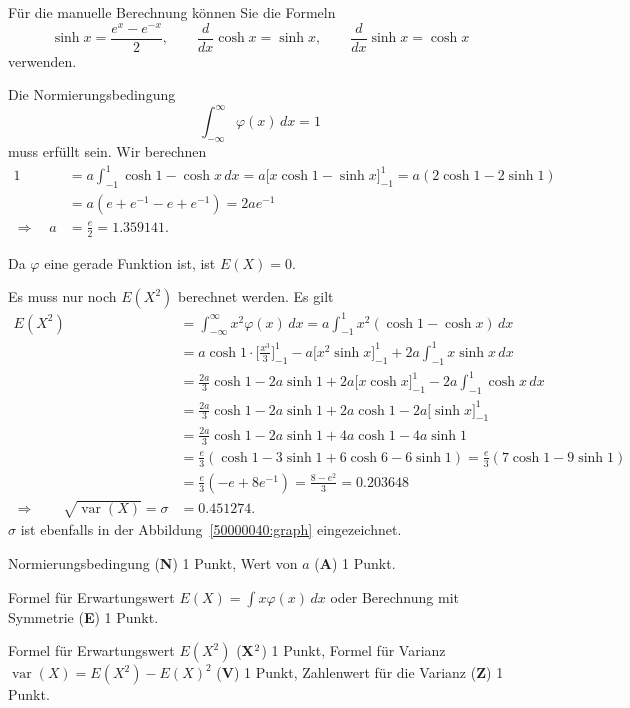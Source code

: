 \begin{hinweis}
Für die manuelle Berechnung können Sie die Formeln
\[
\sinh x = \frac{e^x - e^{-x}}2,\qquad
\frac{d}{dx}\cosh x = \sinh x, \qquad
\frac{d}{dx}\sinh x = \cosh x
\]
verwenden.
\end{hinweis}

\begin{loesung}
\begin{teilaufgaben}
\item
Die Normierungsbedingung
\[
\int_{-\infty}^\infty \varphi(x)\,dx =1
\]
muss erfüllt sein.
Wir berechnen
\begin{align*}
1
&=
a\int_{-1}^1 \cosh 1 - \cosh x\,dx
=
a\biggl[ x \cosh 1 - \sinh x\biggr]_{-1}^1
=
a(2\cosh1 -2\sinh 1)
\\
&=
a(e + e^{-1} - e + e^{-1})
=
2ae^{-1}
\\
\Rightarrow\quad
a&=\frac{e}{2}=1.359141.
\end{align*}
\item
Da $\varphi$ eine gerade Funktion ist, ist $E(X)=0$.
\item
Es muss nur noch $E(X^2)$ berechnet werden.
Es gilt
\begin{align*}
E(X^2)
&=
\int_{-\infty}^\infty x^2\varphi(x)\,dx
=
a\int_{-1}^1 x^2 (\cosh 1 - \cosh x)\,dx
\\
&=
a\cosh 1\cdot \biggl[\frac{x^3}{3}\biggr]_{-1}^1
-
a\biggl[x^2\sinh x\biggr]_{-1}^{1}
+
2a\int_{-1}^1 x\sinh x\,dx
\\
&=
\frac{2a}{3}\cosh 1 - 2a\sinh 1
+2a\biggl[x\cosh x\biggr]_{-1}^1
-2a\int_{-1}^1 \cosh x\,dx
\\
&=
\frac{2a}{3}\cosh 1
 - 2a\sinh 1
+2a\cosh 1
-2a\biggl[\sinh x\biggr]_{-1}^1
\\
&=
\frac{2a}{3}\cosh 1
 - 2a\sinh 1
+4a\cosh 1
-4a\sinh 1
\\
&=
\frac{e}{3}
(\cosh 1 -3\sinh 1 + 6\cosh 6 - 6\sinh 1)
=
\frac{e}{3}(7\cosh 1 - 9 \sinh 1)
\\
&=
\frac{e}{3}(-e+8e^{-1})
=
\frac{8-e^2}{3}
=
0.203648
\\
\Rightarrow\qquad
\sqrt{\operatorname{var}(X)}
=
\sigma
&=
0.451274.
\end{align*}
$\sigma$ ist ebenfalls in der Abbildung~\ref{50000040:graph} eingezeichnet.
\qedhere
\end{teilaufgaben}
\end{loesung}

\begin{bewertung}
\begin{teilaufgaben}
\item
Normierungsbedingung ({\bf N}) 1 Punkt,
Wert von $a$ ({\bf A}) 1 Punkt.
\item
Formel für Erwartungswert $E(X)=\int x\varphi(x)\,dx$
oder Berechnung mit Symmetrie ({\bf E}) 1 Punkt.
\item
Formel für Erwartungswert $E(X^2)$  ({\bf X$\mathstrut^2$}) 1 Punkt,
Formel für Varianz $\operatorname{var}(X) = E(X^2)-E(X)^2$ ({\bf V}) 1 Punkt,
Zahlenwert für die Varianz ({\bf Z}) 1 Punkt.
\end{teilaufgaben}
\end{bewertung}

